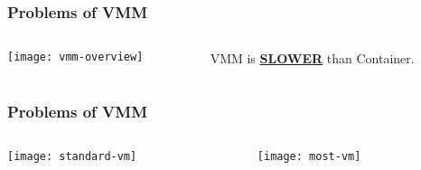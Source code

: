 \begin{frame}[plain]
	\frametitle{Problems of VMM}
	
	
	
	\begin{columns}
		
		\begin{column}{.4\textwidth}
			
			\texttt{[image: vmm-overview]}
			
		\end{column}
		
		\begin{column}{.6\textwidth}
			
			\LARGE
			VMM is \textbf{\underline{SLOWER}} than Container.	
			
			
			
			
			
			
		\end{column}
		
		
	\end{columns}
	
	
\end{frame}


\begin{frame}[plain]
	\frametitle{Problems of VMM}
	
	
	
	\begin{columns}
		
		\begin{column}{.5\textwidth}
			
			\texttt{[image: standard-vm]}
			
		\end{column}
		
		\begin{column}{.5\textwidth}
			
			\texttt{[image: most-vm]}
			
			
			
			
			
			
		\end{column}
		
		
	\end{columns}
	
	
\end{frame}


